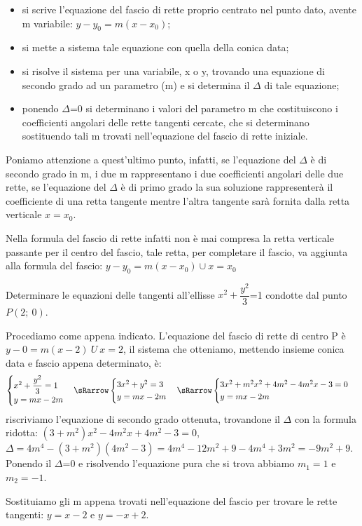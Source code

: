 \begin{itemize} [noitemsep]
  \item si scrive l'equazione del fascio di rette proprio centrato 
nel punto dato, avente m variabile: $y- y_{0} =m\left(x-x_{0}\right)$;
  \item si mette a sistema tale equazione con quella della conica 
data;
  \item si risolve il sistema per una variabile, x o y, trovando una 
equazione di secondo grado ad un parametro (m) e si determina il $ \Delta $ 
di tale equazione;
  \item ponendo $ \Delta $=0 si determinano i valori del parametro m 
che costituiscono i coefficienti angolari delle rette tangenti cercate, che 
si determinano sostituendo tali m trovati nell'equazione del fascio di 
rette iniziale.
\end{itemize}

  Poniamo attenzione a quest'ultimo punto, infatti, se l'equazione 
del $ \Delta $ è di secondo grado in m, i due m rappresentano i due 
coefficienti angolari delle due rette, se l'equazione del $ \Delta $ è di 
primo grado la sua soluzione rappresenterà il coefficiente di una retta 
tangente mentre l'altra tangente sarà fornita dalla retta verticale $x= 
x_{0} $. 

  Nella formula del fascio di rette infatti non è mai compresa la 
retta verticale passante per il centro del fascio, tale retta, per 
completare il fascio, va aggiunta alla formula del fascio:
  $y-y_{0} =m(x- x_{0} ) \cup x= x_{0} $
  

\begin{esempio} Determinare le equazioni delle tangenti 
all'ellisse $ x^{2} + \dfrac{y^{2}}{3} $=1 condotte dal punto $P(2;~0)$.

Procediamo come appena indicato. L'equazione del fascio di rette di centro 
P è $y-0=m(x-2)~ U ~x=2$, il sistema che otteniamo, mettendo insieme conica 
data e fascio appena determinato, è:
\[\begin{cases}  x^{2}+\dfrac{y^{2}}{3}=1   \\ y=mx-2m  
\end{cases} \sRarrow  
\begin{cases}  3x^{2}+y^{2}=3   \\ y=mx-2m  
\end{cases} \sRarrow  
\begin{cases}  3x^{2}+m^{2}x^{2}+4m^{2}-4m^{2}x-3=0   \\ y=mx-2m  
\end{cases}\]
riscriviamo l'equazione di secondo grado ottenuta, trovandone il $\Delta$ 
con la formula ridotta: \((3+ m^{2} ) x^{2} -4 m^{2} x+4 m^{2} -3=0\), 
\(\Delta =4 m^{4} -(3+ m^{2} )(4m^{2}-3)=
4 m^{4} -12 m^{2} +9-4 m^{4} +3 m^{2} =-9 m^{2} +9\). 
Ponendo il $\Delta$=0 e risolvendo 
l'equazione pura che si trova abbiamo \(m_{1} = 1\) e \(m_{2} = -1\).

Sostituiamo gli m appena trovati nell'equazione del fascio per trovare le 
rette tangenti: \(y=x-2\) e \(y=-x+2\).
\end{esempio}

